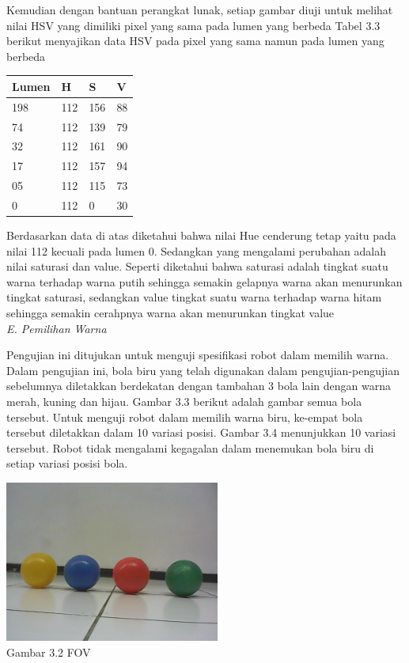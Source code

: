 \documentclass[10pt,journal,compsoc]{IEEEtran}
\begin{document}
    Kemudian dengan bantuan perangkat lunak, setiap gambar diuji untuk melihat nilai HSV yang dimiliki pixel yang sama pada lumen yang berbeda
  Tabel 3.3 berikut menyajikan data HSV pada pixel yang sama namun pada lumen yang berbeda
  
   \begin{center}
   \begin{tabular}{ |l|l|l|l| }
    \hline
    Lumen & H & S & V\\
   \hline
    198 & 112  & 156  & 88 \\
    74  & 112  & 139  & 79 \\
    32  & 112  & 161  & 90 \\
    17  & 112  & 157  & 94 \\
    05  & 112  & 115  & 73 \\
    0   & 112  & 0    & 30 \\
    \hline
   \end{tabular}
   \end{center}
   
   Berdasarkan data di atas diketahui bahwa nilai Hue cenderung tetap yaitu pada nilai 112 kecuali pada lumen 0.
   Sedangkan yang mengalami perubahan adalah nilai saturasi dan value. 
   Seperti diketahui bahwa saturasi adalah tingkat suatu warna terhadap warna putih sehingga semakin gelapnya warna akan menurunkan tingkat saturasi, sedangkan value tingkat suatu warna terhadap warna hitam sehingga semakin cerahpnya warna akan menurunkan tingkat value\\

  \noindent \textit{E. Pemilihan Warna}
  
  Pengujian ini ditujukan untuk menguji spesifikasi robot dalam memilih warna. 
  Dalam pengujian ini, bola biru yang telah digunakan dalam pengujian-pengujian sebelumnya diletakkan berdekatan dengan tambahan 3 bola lain dengan warna merah, kuning dan hijau. 
  Gambar 3.3 berikut adalah gambar semua bola tersebut. 
  Untuk menguji robot dalam memilih warna biru, ke-empat bola tersebut diletakkan dalam 10 variasi posisi. 
  Gambar 3.4 menunjukkan 10 variasi tersebut. Robot tidak mengalami kegagalan dalam menemukan bola biru di setiap variasi posisi bola.

  \begin{center}
    \includegraphics[width=200pt]{ball_all}\\
    Gambar 3.2 FOV
  \end{center}
  
\end{document}
